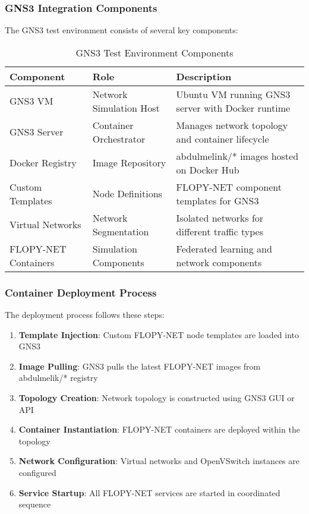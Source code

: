 \subsubsection{GNS3 Integration Components}

The GNS3 test environment consists of several key components:

\begin{table}[H]
\centering
\caption{GNS3 Test Environment Components}
\label{tab:gns3-components}
\begin{tabular}{@{}llp{6cm}@{}}
\toprule
\textbf{Component} & \textbf{Role} & \textbf{Description} \\
\midrule
GNS3 VM & Network Simulation Host & Ubuntu VM running GNS3 server with Docker runtime \\
GNS3 Server & Container Orchestrator & Manages network topology and container lifecycle \\
Docker Registry & Image Repository & abdulmelink/* images hosted on Docker Hub \\
Custom Templates & Node Definitions & FLOPY-NET component templates for GNS3 \\
Virtual Networks & Network Segmentation & Isolated networks for different traffic types \\
FLOPY-NET Containers & Simulation Components & Federated learning and network components \\
\bottomrule
\end{tabular}
\end{table}

\subsubsection{Container Deployment Process}

The deployment process follows these steps:

\begin{enumerate}
    \item \textbf{Template Injection}: Custom FLOPY-NET node templates are loaded into GNS3
    \item \textbf{Image Pulling}: GNS3 pulls the latest FLOPY-NET images from abdulmelik/* registry
    \item \textbf{Topology Creation}: Network topology is constructed using GNS3 GUI or API
    \item \textbf{Container Instantiation}: FLOPY-NET containers are deployed within the topology
    \item \textbf{Network Configuration}: Virtual networks and OpenVSwitch instances are configured
    \item \textbf{Service Startup}: All FLOPY-NET services are started in coordinated sequence
\end{enumerate}

